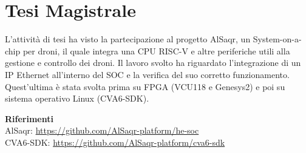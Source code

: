 \section{Tesi Magistrale}

L'attività di tesi ha visto la partecipazione al progetto AlSaqr, un
System-on-a-chip per droni, il quale integra una CPU RISC-V e altre periferiche
utili alla gestione e controllo dei droni. Il lavoro svolto ha riguardato
l'integrazione di un IP Ethernet all'interno del SOC e la verifica del suo
corretto funzionamento. Quest'ultima è stata svolta prima su FPGA (VCU118 e
Genesys2) e poi su sistema operativo Linux (CVA6-SDK).

\vspace{2mm}
\textbf{Riferimenti} \\
AlSaqr: \url{https://github.com/AlSaqr-platform/he-soc} \\
CVA6-SDK: \url{https://github.com/AlSaqr-platform/cva6-sdk}
